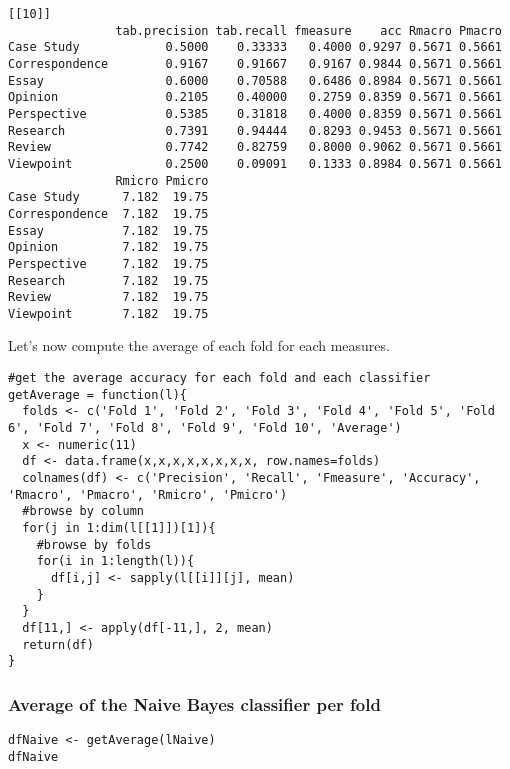 \documentclass[]{article}
\begin{document}
\begin{lstlisting}[frame=single]
[[10]]
               tab.precision tab.recall fmeasure    acc Rmacro Pmacro
Case Study            0.5000    0.33333   0.4000 0.9297 0.5671 0.5661
Correspondence        0.9167    0.91667   0.9167 0.9844 0.5671 0.5661
Essay                 0.6000    0.70588   0.6486 0.8984 0.5671 0.5661
Opinion               0.2105    0.40000   0.2759 0.8359 0.5671 0.5661
Perspective           0.5385    0.31818   0.4000 0.8359 0.5671 0.5661
Research              0.7391    0.94444   0.8293 0.9453 0.5671 0.5661
Review                0.7742    0.82759   0.8000 0.9062 0.5671 0.5661
Viewpoint             0.2500    0.09091   0.1333 0.8984 0.5671 0.5661
               Rmicro Pmicro
Case Study      7.182  19.75
Correspondence  7.182  19.75
Essay           7.182  19.75
Opinion         7.182  19.75
Perspective     7.182  19.75
Research        7.182  19.75
Review          7.182  19.75
Viewpoint       7.182  19.75
\end{lstlisting}

Let's now compute the average of each fold for each measures.

\begin{lstlisting}[frame=single]
#get the average accuracy for each fold and each classifier
getAverage = function(l){
  folds <- c('Fold 1', 'Fold 2', 'Fold 3', 'Fold 4', 'Fold 5', 'Fold 6', 'Fold 7', 'Fold 8', 'Fold 9', 'Fold 10', 'Average')
  x <- numeric(11)
  df <- data.frame(x,x,x,x,x,x,x,x, row.names=folds)
  colnames(df) <- c('Precision', 'Recall', 'Fmeasure', 'Accuracy', 'Rmacro', 'Pmacro', 'Rmicro', 'Pmicro')
  #browse by column
  for(j in 1:dim(l[[1]])[1]){
    #browse by folds
    for(i in 1:length(l)){
      df[i,j] <- sapply(l[[i]][j], mean)
    }
  }
  df[11,] <- apply(df[-11,], 2, mean)
  return(df)
}
\end{lstlisting}

\subsubsection{Average of the Naive Bayes classifier per fold}

\begin{lstlisting}[frame=single]
dfNaive <- getAverage(lNaive)
dfNaive
\end{lstlisting}
\end{document}
